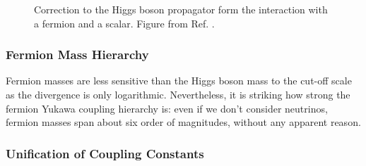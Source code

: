 \begin{figure}[ht]
\centering
{}
\caption{Correction to the Higgs boson propagator form the interaction with  a fermion and  a scalar. Figure from Ref. \cite{Martin:1997ns}.}
\label{fig:sm:h_corr}
\end{figure}

\subsubsection*{Fermion Mass Hierarchy} 

Fermion masses are less sensitive than the Higgs boson mass to the cut-off scale as the divergence is only logarithmic. Nevertheless, it is striking how strong the fermion Yukawa coupling hierarchy is: even if we don't consider neutrinos, fermion masses span about six order of magnitudes, without any apparent reason.

\subsubsection*{Unification of Coupling Constants}

